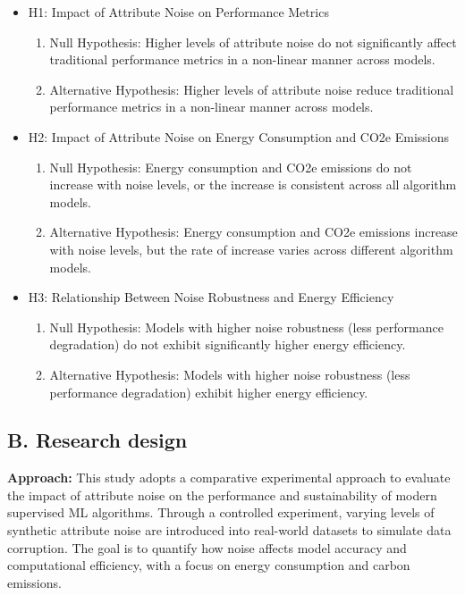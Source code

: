 \documentclass[conference]{IEEEtran}
\begin{document}
\begin{itemize}[noitemsep, leftmargin=*]

    \item H1: Impact of Attribute Noise on Performance Metrics
    \begin{enumerate}
        \item Null Hypothesis: Higher levels of attribute noise do not significantly affect traditional performance metrics in a non-linear manner across models.
        \item Alternative Hypothesis: Higher levels of attribute noise reduce traditional performance metrics in a non-linear manner across models.
    \end{enumerate}

    \item H2: Impact of Attribute Noise on Energy Consumption and CO2e Emissions
    \begin{enumerate}
        \item Null Hypothesis: Energy consumption and CO2e emissions do not increase with noise levels, or the increase is consistent across all algorithm models.
        \item Alternative Hypothesis: Energy consumption and CO2e emissions increase with noise levels, but the rate of increase varies across different algorithm models.
    \end{enumerate}

    \item H3: Relationship Between Noise Robustness and Energy Efficiency
    \begin{enumerate}
        \item Null Hypothesis: Models with higher noise robustness (less performance degradation) do not exhibit significantly higher energy efficiency.
        \item Alternative Hypothesis: Models with higher noise robustness (less performance degradation) exhibit higher energy efficiency.
    \end{enumerate}

\end{itemize}


\subsection*{B. Research design}

\textbf{Approach:} This study adopts a comparative experimental approach to evaluate the impact of attribute noise on the performance and sustainability of modern supervised ML algorithms. Through a controlled experiment, varying levels of synthetic attribute noise are introduced into real-world datasets to simulate data corruption. The goal is to quantify how noise affects model accuracy and computational efficiency, with a focus on energy consumption and carbon emissions.
\newline
\end{document}
